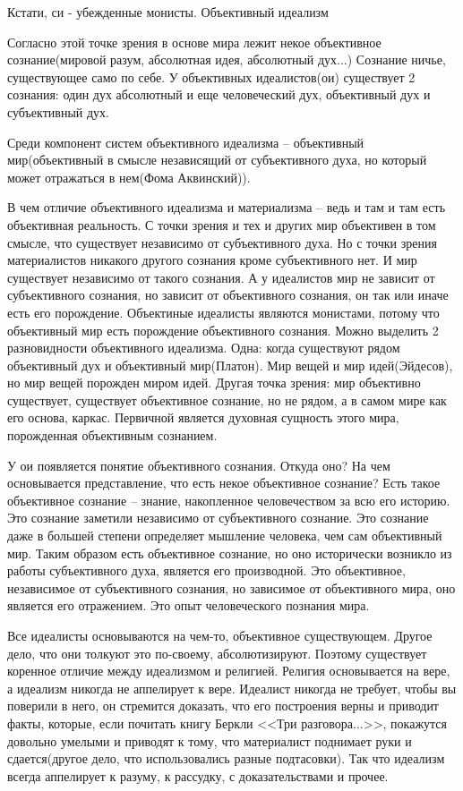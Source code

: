 Кстати, си - убежденные монисты.
Объективный идеализм

Согласно этой точке зрения в основе мира лежит некое объективное сознание(мировой разум, абсолютная идея, абсолютный дух...) Сознание ничье, существующее само по себе. У объективных идеалистов(ои) существует 2 сознания: один дух абсолютный и еще человеческий дух, объективный дух и субъективный дух.

Среди компонент систем объективного идеализма – объективный мир(объективный в смысле независящий от субъективного духа, но который может отражаться в нем(Фома Аквинский)).

В чем отличие объективного идеализма и материализма – ведь и там и там есть объективная реальность. С точки зрения и тех и других мир объективен в том смысле, что существует независимо от субъективного духа. Но с точки зрения материалистов никакого другого сознания кроме субъективного нет. И мир существует независимо от такого сознания. А у идеалистов мир не зависит от субъективного сознания, но зависит от объективного сознания, он так или иначе есть его порождение. Объектиные идеалисты являются монистами, потому что объективный мир есть порождение объективного сознания. Можно выделить 2 разновидности объективного идеализма. Одна: когда существуют рядом объективный дух и объективный мир(Платон). Мир вещей и мир идей(Эйдесов), но мир вещей порожден миром идей. Другая точка зрения: мир объективно существует, существует объективное сознание, но не рядом, а в самом мире как его основа, каркас. Первичной является духовная сущность этого мира, порожденная объективным сознанием.

У ои появляется понятие объективного сознания. Откуда оно? На чем основывается представление, что есть некое объективное сознание? Есть такое объективное сознание – знание, накопленное человечеством за всю его историю. Это сознание заметили независимо от субъективного сознание. Это сознание даже в большей степени определяет мышление человека, чем сам объективный мир. Таким образом есть объективное сознание, но оно исторически возникло из работы субъективного духа, является его производной. Это объективное, независимое от субъективного сознания, но зависимое от объективного мира, оно является его отражением. Это опыт человеческого познания мира.

    Все идеалисты основываются на чем-то, объективное существующем. Другое дело, что они толкуют это по-своему, абсолютизируют. Поэтому существует коренное отличие между идеализмом и религией. Религия основывается на вере, а идеализм никогда не аппелирует к вере. Идеалист никогда не требует, чтобы вы поверили в него, он стремится доказать, что его построения верны и приводит факты, которые, если почитать книгу Беркли <<Три разговора...>>, покажутся довольно умелыми и приводят к тому, что материалист поднимает руки и сдается(другое дело, что использовались разные подтасовки). Так что идеализм всегда аппелирует к разуму, к рассудку, с доказательствами и прочее.